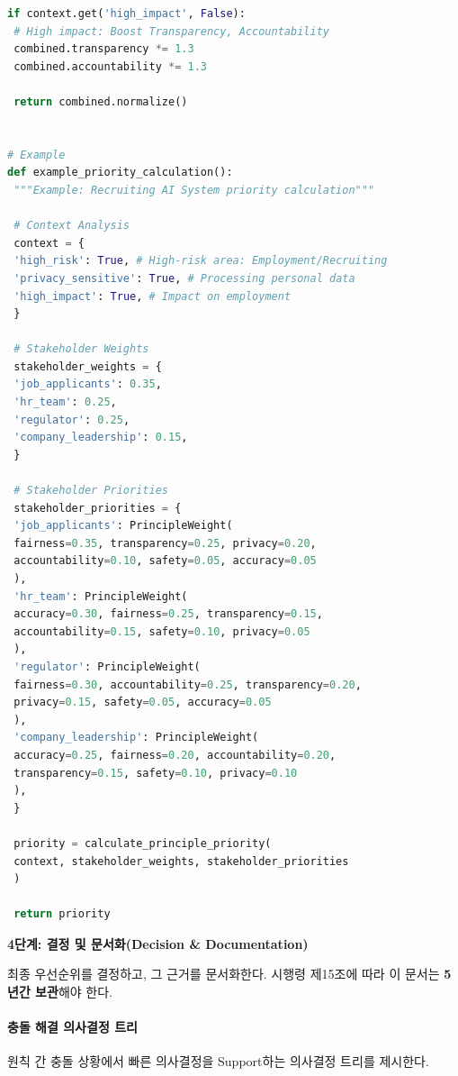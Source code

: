 \begin{lstlisting}[language=Python, caption={Principle Priority Scoring}, label={lst:priority_scoring}]
 if context.get('high_impact', False):
 # High impact: Boost Transparency, Accountability
 combined.transparency *= 1.3
 combined.accountability *= 1.3
 
 return combined.normalize()


# Example
def example_priority_calculation():
 """Example: Recruiting AI System priority calculation"""
 
 # Context Analysis
 context = {
 'high_risk': True, # High-risk area: Employment/Recruiting
 'privacy_sensitive': True, # Processing personal data
 'high_impact': True, # Impact on employment
 }
 
 # Stakeholder Weights
 stakeholder_weights = {
 'job_applicants': 0.35,
 'hr_team': 0.25,
 'regulator': 0.25,
 'company_leadership': 0.15,
 }
 
 # Stakeholder Priorities
 stakeholder_priorities = {
 'job_applicants': PrincipleWeight(
 fairness=0.35, transparency=0.25, privacy=0.20,
 accountability=0.10, safety=0.05, accuracy=0.05
 ),
 'hr_team': PrincipleWeight(
 accuracy=0.30, fairness=0.25, transparency=0.15,
 accountability=0.15, safety=0.10, privacy=0.05
 ),
 'regulator': PrincipleWeight(
 fairness=0.30, accountability=0.25, transparency=0.20,
 privacy=0.15, safety=0.05, accuracy=0.05
 ),
 'company_leadership': PrincipleWeight(
 accuracy=0.25, fairness=0.20, accountability=0.20,
 transparency=0.15, safety=0.10, privacy=0.10
 ),
 }
 
 priority = calculate_principle_priority(
 context, stakeholder_weights, stakeholder_priorities
 )
 
 return priority
\end{lstlisting}

\textbf{4단계: 결정 및 문서화(Decision \& Documentation)}

최종 우선순위를 결정하고, 그 근거를 문서화한다. 
시행령 제15조에 따라 이 문서는 \textbf{5년간 보관}해야 한다.


\paragraph{충돌 해결 의사결정 트리}

원칙 간 충돌 상황에서 빠른 의사결정을 Support하는 의사결정 트리를 제시한다.

